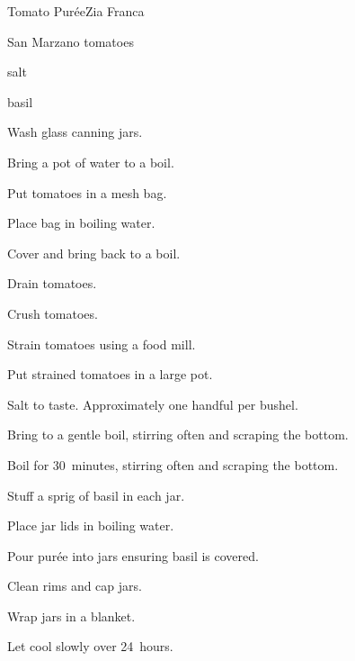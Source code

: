 \begin{recipe}{Tomato Purée}{Zia Franca}{}

\begin{ingredients}
\item San Marzano tomatoes
\item salt
\item basil
\end{ingredients}

\begin{directions}
\item Wash glass canning jars.
\item Bring a pot of water to a boil.
\item Put tomatoes in a mesh bag.
\item Place bag in boiling water.
\item Cover and bring back to a boil.
\item Drain tomatoes.
\item Crush tomatoes.
\item Strain tomatoes using a food mill.
\item Put strained tomatoes in a large pot.
\item Salt to taste. Approximately one handful per bushel.
\item Bring to a gentle boil, stirring often and scraping the bottom.
\item Boil for 30~minutes, stirring often and scraping the bottom.
\item Stuff a sprig of basil in each jar.
\item Place jar lids in boiling water.
\item Pour purée into jars ensuring basil is covered.
\item Clean rims and cap jars.
\item Wrap jars in a blanket.
\item Let cool slowly over 24~hours.
\end{directions}

\end{recipe}
